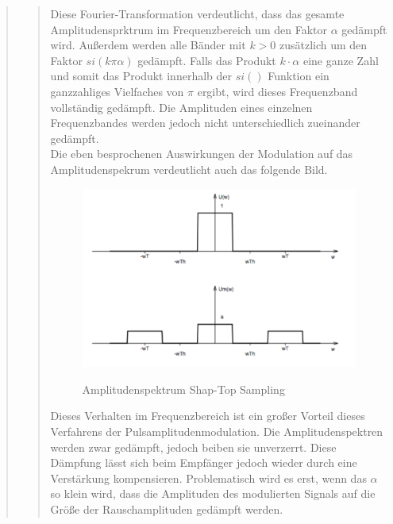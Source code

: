 \begin{quote}
\begin{quote}
        Diese Fourier-Transformation verdeutlicht, dass das gesamte Amplitudensprktrum im Frequenzbereich um den Faktor
        $\alpha$ gedämpft wird. Außerdem werden alle Bänder mit $k > 0$
        zusätzlich um den Faktor $si(k \pi \alpha)$ gedämpft. Falls das Produkt $k \cdot \alpha$ eine ganze Zahl und somit 
        das Produkt innerhalb der $si()$ Funktion
        ein ganzzahliges Vielfaches von $\pi$ ergibt, wird dieses Frequenzband
        vollständig gedämpft. Die Amplituden eines einzelnen Frequenzbandes werden jedoch nicht unterschiedlich zueinander gedämpft.\\
        
        Die eben besprochenen Auswirkungen der Modulation auf das Amplitudenspekrum verdeutlicht auch das folgende Bild.
        
        \begin{figure}[H]
        \centering
            \includegraphics[scale=0.7, trim = 0cm 0cm 0cm 0cm, clip]{./Bilder/AmplitudenspektrumShap_Top}
                \caption{Amplitudenspektrum Shap-Top Sampling}
                \cite{AmplitudenspektrumShap_Top}
        \end{figure}
        
        Dieses Verhalten im Frequenzbereich ist ein großer Vorteil dieses Verfahrens der Pulsamplitudenmodulation. Die
        Amplitudenspektren werden zwar gedämpft, jedoch beiben sie unverzerrt.
        Diese Dämpfung lässt sich beim Empfänger jedoch wieder durch eine
        Verstärkung kompensieren. Problematisch wird es erst, wenn das $\alpha$ so klein wird, 
        dass die Amplituden des modulierten Signals auf die Größe der Rauschamplituden gedämpft werden.\vspace{1em}
        

\end{quote}
\end{quote}
